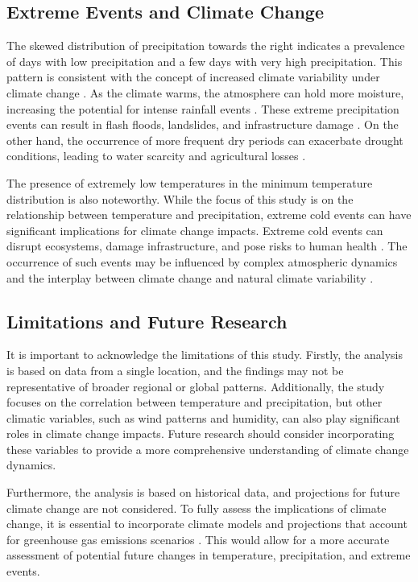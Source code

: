 \documentclass{article}
\begin{document}
\subsection{Extreme Events and Climate Change}

The skewed distribution of precipitation towards the right indicates a prevalence of days with low precipitation and a few days with very high precipitation. This pattern is consistent with the concept of increased climate variability under climate change \cite{IPCC2012}. As the climate warms, the atmosphere can hold more moisture, increasing the potential for intense rainfall events \cite{trenberth2003changing}. These extreme precipitation events can result in flash floods, landslides, and infrastructure damage \cite{IPCC2012}. On the other hand, the occurrence of more frequent dry periods can exacerbate drought conditions, leading to water scarcity and agricultural losses \cite{IPCC2012}.

The presence of extremely low temperatures in the minimum temperature distribution is also noteworthy. While the focus of this study is on the relationship between temperature and precipitation, extreme cold events can have significant implications for climate change impacts. Extreme cold events can disrupt ecosystems, damage infrastructure, and pose risks to human health \cite{screen2014arctic}. The occurrence of such events may be influenced by complex atmospheric dynamics and the interplay between climate change and natural climate variability \cite{screen2014arctic}.

\subsection{Limitations and Future Research}

It is important to acknowledge the limitations of this study. Firstly, the analysis is based on data from a single location, and the findings may not be representative of broader regional or global patterns. Additionally, the study focuses on the correlation between temperature and precipitation, but other climatic variables, such as wind patterns and humidity, can also play significant roles in climate change impacts. Future research should consider incorporating these variables to provide a more comprehensive understanding of climate change dynamics.

Furthermore, the analysis is based on historical data, and projections for future climate change are not considered. To fully assess the implications of climate change, it is essential to incorporate climate models and projections that account for greenhouse gas emissions scenarios \cite{IPCC2014}. This would allow for a more accurate assessment of potential future changes in temperature, precipitation, and extreme events.
\end{document}
